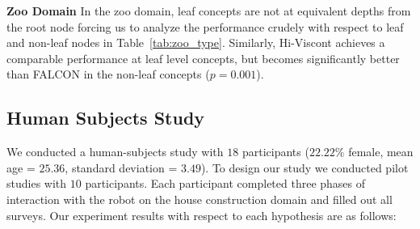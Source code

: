 \noindent\textbf{Zoo Domain} 
In the zoo domain, leaf concepts are not at equivalent depths from the root node forcing us to analyze the performance crudely with respect to leaf and non-leaf nodes in Table~\ref{tab:zoo_type}.
Similarly, Hi-Viscont achieves a comparable performance at leaf level concepts, but becomes significantly better than FALCON in the non-leaf concepts ($p=0.001$).



\begin{table}[]
\caption{The results of the human-subjects experiment. Success Rate and Node Accuracy are measured in percentage. Hi-Viscont is better than FALCON on all metrics with significance as described in the Human Subjects Study Section.}
\label{tab:human_subject}
\end{table}
\subsection{Human Subjects Study}
We conducted a human-subjects study with $18$ participants ($22.22\%$ female, mean age = $25.36$, standard deviation = $3.49$). To design our study we conducted pilot studies with $10$ participants.
Each participant completed three phases of interaction with the robot on the house construction domain and filled out all surveys.
Our experiment results with respect to each hypothesis are as follows:

